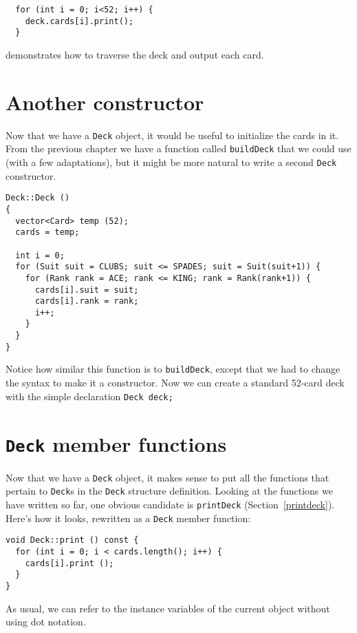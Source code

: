 \begin{lstlisting}
  for (int i = 0; i<52; i++) {
    deck.cards[i].print();
  }
\end{lstlisting}
%
demonstrates how to traverse the deck and output each card.

\section {Another constructor}

Now that we have a {\tt Deck} object, it would be useful
to initialize the cards in it.  From the previous chapter we
have a function called {\tt buildDeck} that we could use
(with a few adaptations), but it might be more natural to
write a second {\tt Deck} constructor.


\begin{lstlisting}
Deck::Deck ()
{
  vector<Card> temp (52);
  cards = temp;

  int i = 0;
  for (Suit suit = CLUBS; suit <= SPADES; suit = Suit(suit+1)) {
    for (Rank rank = ACE; rank <= KING; rank = Rank(rank+1)) {
      cards[i].suit = suit;
      cards[i].rank = rank;
      i++;
    }
  }
}
\end{lstlisting}
%
Notice how similar this function is to {\tt buildDeck}, except
that we had to change the syntax to make it a constructor.
Now we can create a standard 52-card deck with the simple
declaration {\tt Deck deck;}

\section {{\tt Deck} member functions}

Now that we have a {\tt Deck} object, it makes sense to put
all the functions that pertain to {\tt Deck}s in the {\tt Deck}
structure definition.  Looking at the functions we have written so
far, one obvious candidate is {\tt printDeck} (Section~\ref{printdeck}).
Here's how it looks, rewritten as a {\tt Deck} member function:


\begin{lstlisting}
void Deck::print () const {
  for (int i = 0; i < cards.length(); i++) {
    cards[i].print ();
  }
}
\end{lstlisting}
%
As usual, we can refer to the instance variables of the current
object without using dot notation.

